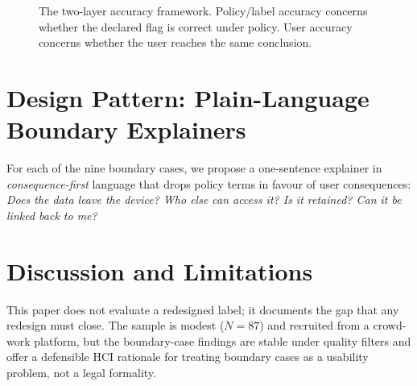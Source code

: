 \documentclass[11pt,a4paper]{article}
\begin{document}
\begin{figure}[h]\centering
{}
\caption{The two-layer accuracy framework. Policy/label accuracy concerns
whether the declared flag is correct under policy. User accuracy concerns
whether the user reaches the same conclusion.}
\label{fig:mismatch}\end{figure}

\section{Design Pattern: Plain-Language Boundary Explainers}
For each of the nine boundary cases, we propose a one-sentence explainer in
\emph{consequence-first} language that drops policy terms in favour of user
consequences: \emph{Does the data leave the device? Who else can access it?
Is it retained? Can it be linked back to me?}

\section{Discussion and Limitations}
This paper does not evaluate a redesigned label; it documents the gap that any
redesign must close. The sample is modest ($N=87$) and recruited from a
crowd-work platform, but the boundary-case findings are stable under quality filters
and offer a
defensible HCI rationale for treating boundary cases as a usability problem,
not a legal formality.


\end{document}
